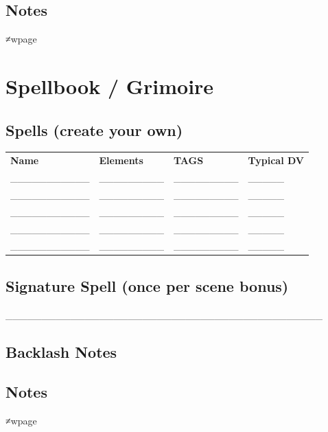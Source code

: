 \documentclass[11pt]{article}
\begin{document}
\subsection*{Notes}
\vspace{3cm}
≠wpage

\section*{Spellbook / Grimoire}

\subsection*{Spells (create your own)}
\small
\begin{tabularx}{\textwidth}{p{3cm} p{2.5cm} p{2.5cm} X}
\textbf{Name} & \textbf{Elements} & \textbf{TAGS} & \textbf{Typical DV} \\
___________ & _________ & _________ & _____ \\
___________ & _________ & _________ & _____ \\
___________ & _________ & _________ & _____ \\
___________ & _________ & _________ & _____ \\
___________ & _________ & _________ & _____ \\
\end{tabularx}
\normalsize

\subsection*{Signature Spell (once per scene bonus)}
\noindent ____________________________________________

\subsection*{Backlash Notes}
\vspace{2cm}

\subsection*{Notes}
\vspace{4cm}
≠wpage

\end{document}
